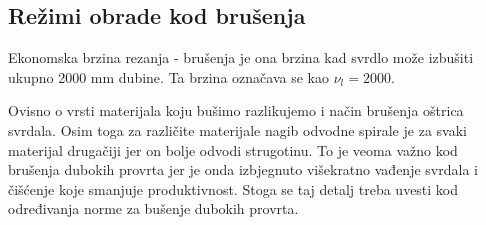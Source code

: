 \documentclass[a4paper,12pt]{article}
\numberwithin{figure}{section}
\begin{document}
\subsection{Režimi obrade kod brušenja}
Ekonomska brzina rezanja - brušenja je ona brzina kad svrdlo može izbušiti ukupno 2000 mm dubine. Ta brzina označava se kao $\nu_{l}=2000$.\par
Ovisno o vrsti materijala koju bušimo razlikujemo i način brušenja oštrica svrdala. Osim toga za različite materijale nagib odvodne spirale je za svaki materijal drugačiji jer on bolje odvodi strugotinu. To je veoma važno kod brušenja dubokih provrta jer je onda izbjegnuto višekratno vađenje svrdala i čišćenje koje smanjuje produktivnost. Stoga se taj detalj treba uvesti kod određivanja norme za bušenje dubokih provrta.
\begin{table}[!h]
\centering
{}
\end{table}
\end{document}
